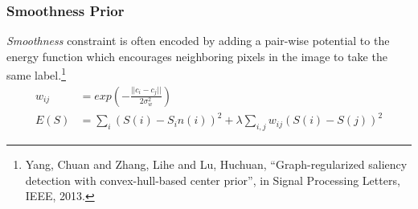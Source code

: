\documentclass[notheorems,serif,table,compress]{beamer}  %
\begin{document}
\begin{frame}
\frametitle{Smoothness Prior}
{\color{blue}\emph{Smoothness}} constraint is often encoded by adding a pair-wise potential to the energy function which encourages neighboring pixels in the image to take the same label.\footnote{Yang, Chuan and Zhang, Lihe and Lu, Huchuan, ``Graph-regularized saliency detection with convex-hull-based center prior'', in Signal Processing Letters, IEEE, 2013.}
\begin{align}
w_{ij} & = exp\left(-\frac{||c_i-c_j||}{2\sigma_w^2}\right)\\
E(S) & = \sum_{i}(S(i)-S_in(i))^2+\lambda \sum_{i, j}w_{ij}(S(i)-S(j))^2
\end{align}
\end{frame}








\end{document}
